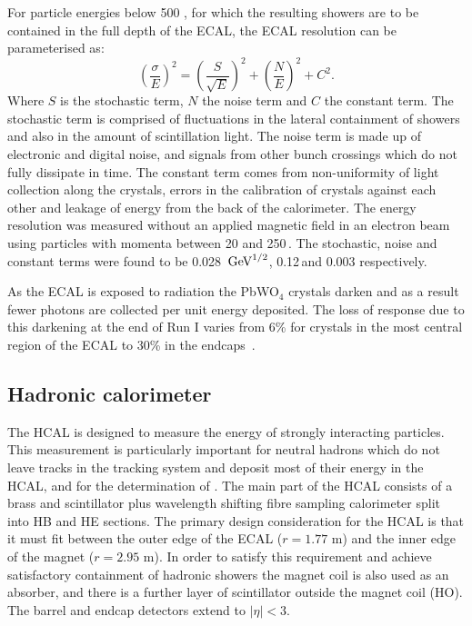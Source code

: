 For particle energies below 500 \GeV, for which the resulting showers are to be contained in the full depth of the \ac{ECAL}, the \ac{ECAL} resolution can be parameterised as:
\begin{equation}
  \label{eq:ecalres}
  \left(\frac{\sigma}{E}\right)^2=\left(\frac{S}{\sqrt{E}}\right)^2+\left(\frac{N}{E}\right)^2+C^2.
\end{equation}
Where $S$ is the stochastic term, $N$ the noise term and $C$ the constant term. The stochastic term is comprised of fluctuations in the lateral containment of showers and also in the amount of scintillation light. The noise term is made up of electronic and digital noise, and signals from other bunch crossings which do not fully dissipate in time. The constant term comes from non-uniformity of light collection along the crystals, errors in the calibration of crystals against each other and leakage of energy from the back of the calorimeter. The energy resolution was measured without an applied magnetic field in an electron beam using particles with momenta between 20 and 250\,\GeV. The stochastic, noise and constant terms were found to be 0.028 $\,\text{Ge\hspace{-.08em}V}^{1/2}$, 0.12\,\GeV and 0.003 respectively.

As the \ac{ECAL} is exposed to radiation the PbWO$_{4}$ crystals darken and as a result fewer photons are collected per unit energy deposited. The loss of response due to this darkening at the end of Run I varies from 6\% for crystals in the most central region of the \ac{ECAL} to 30\% in the endcaps~\cite{CMS-DP-2015-063}.

 

\subsection{Hadronic calorimeter}
\label{sec:HCAL}
The \ac{HCAL} is designed to measure the energy of strongly interacting particles. This measurement is particularly important for neutral hadrons which do not leave tracks in the tracking system and deposit most of their energy in the \ac{HCAL}, and for the determination of \MET.  The main part of the \ac{HCAL} consists of a brass and scintillator plus wavelength shifting fibre sampling calorimeter split into \ac{HB} and \ac{HE} sections. The primary design consideration for the \ac{HCAL} is that it must fit between the outer edge of the \ac{ECAL} ($r=1.77$ m) and the inner edge of the magnet ($r=2.95$ m). In order to satisfy this requirement and achieve satisfactory containment of hadronic showers the magnet coil is also used as an absorber, and there is a further layer of scintillator outside the magnet coil (\ac{HO}). The barrel and endcap detectors extend to $|\eta|<3$.

